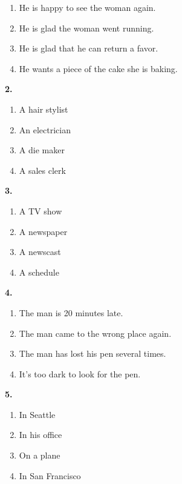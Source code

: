 \documentclass[12pt]{article}
\begin{document}
\begin{enumerate}[label=(\Alph*),leftmargin=*,itemsep=0.2em]
\item He is happy to see the woman again.
\item He is glad the woman went running.
\item He is glad that he can return a favor.
\item He wants a piece of the cake she is baking.
\end{enumerate}
\par
\vspace{0.25\baselineskip}
\noindent\textbf{2.}
\begin{enumerate}[label=(\Alph*),leftmargin=*,itemsep=0.2em]
\item A hair stylist
\item An electrician
\item A die maker
\item A sales clerk
\end{enumerate}
\par
\vspace{0.25\baselineskip}
\noindent\textbf{3.}
\begin{enumerate}[label=(\Alph*),leftmargin=*,itemsep=0.2em]
\item A TV show
\item A newspaper
\item A newscast
\item A schedule
\end{enumerate}
\par
\vspace{0.25\baselineskip}
\noindent\textbf{4.}
\begin{enumerate}[label=(\Alph*),leftmargin=*,itemsep=0.2em]
\item The man is 20 minutes late.
\item The man came to the wrong place again.
\item The man has lost his pen several times.
\item It's too dark to look for the pen.
\end{enumerate}
\par
\vspace{0.25\baselineskip}
\noindent\textbf{5.}
\begin{enumerate}[label=(\Alph*),leftmargin=*,itemsep=0.2em]
\item In Seattle
\item In his office
\item On a plane
\item In San Francisco
\end{enumerate}
\end{document}

